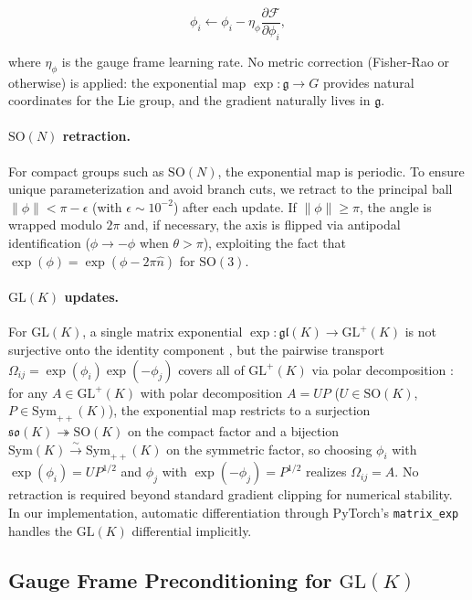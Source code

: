 \documentclass[twoside,11pt]{article}
\begin{document}
\begin{equation}
\phi_i \leftarrow \phi_i - \eta_\phi \frac{\partial \mathcal{F}}{\partial \phi_i},
\label{eq:phi_update}
\end{equation}

where $\eta_\phi$ is the gauge frame learning rate. No metric correction (Fisher-Rao or otherwise) is applied: the exponential map $\exp: \mathfrak{g} \to G$ provides natural coordinates for the Lie group, and the gradient naturally lives in $\mathfrak{g}$.

\paragraph{$\mathrm{SO}(N)$ retraction.} For compact groups such as $\mathrm{SO}(N)$, the exponential map is periodic. To ensure unique parameterization and avoid branch cuts, we retract to the principal ball $\|\phi\| < \pi - \epsilon$ (with $\epsilon \sim 10^{-2}$) after each update. If $\|\phi\| \geq \pi$, the angle is wrapped modulo $2\pi$ and, if necessary, the axis is flipped via antipodal identification ($\phi \to -\phi$ when $\theta > \pi$), exploiting the fact that $\exp(\phi) = \exp(\phi - 2\pi \hat{n})$ for $\mathrm{SO}(3)$.

\paragraph{$\mathrm{GL}(K)$ updates.} For $\mathrm{GL}(K)$, a single matrix exponential $\exp: \mathfrak{gl}(K) \to \mathrm{GL}^+(K)$ is not surjective onto the identity component \citep{culver1966existence}, but the pairwise transport $\Omega_{ij} = \exp(\phi_i)\exp(-\phi_j)$ covers all of $\mathrm{GL}^+(K)$ via polar decomposition \citep[\S8]{Higham2008}: for any $A \in \mathrm{GL}^+(K)$ with polar decomposition $A = UP$ ($U \in \mathrm{SO}(K)$, $P \in \mathrm{Sym}_{++}(K)$), the exponential map restricts to a surjection $\mathfrak{so}(K) \twoheadrightarrow \mathrm{SO}(K)$ on the compact factor and a bijection $\mathrm{Sym}(K) \xrightarrow{\sim} \mathrm{Sym}_{++}(K)$ on the symmetric factor, so choosing $\phi_i$ with $\exp(\phi_i) = UP^{1/2}$ and $\phi_j$ with $\exp(-\phi_j) = P^{1/2}$ realizes $\Omega_{ij} = A$. No retraction is required beyond standard gradient clipping for numerical stability. In our implementation, automatic differentiation through PyTorch's \texttt{matrix\_exp} handles the $\mathrm{GL}(K)$ differential implicitly.

\subsection{Gauge Frame Preconditioning for $\mathrm{GL}(K)$}
\label{sec:glk_preconditioning}
\end{document}
